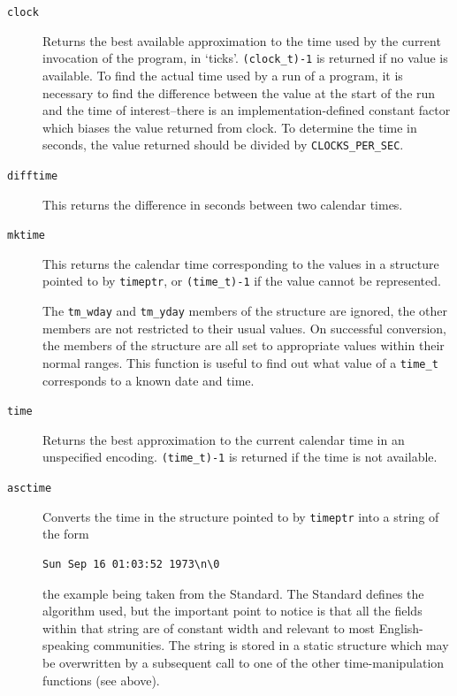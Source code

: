   \begin{description}
   \item[\texttt{clock}] Returns the best available approximation to the time used by  the
    current  invocation  of the program, in `ticks'.
    \texttt{(clock\_t)-1} is returned if no  value  is  available.   To find
    the  actual  time used by a run of a program, it is necessary to find the
    difference between the value at the start  of  the run and the time of
    interest--there is an implementation-defined constant factor which
    biases  the value  returned  from  clock.   To  determine the time in
    seconds,  the  value  returned  should  be   divided   by
    \texttt{CLOCKS\_PER\_SEC}.

   \item[\texttt{difftime}] This  returns  the  difference  in  seconds  between  two calendar
    times.

   \item[\texttt{mktime}] 
    This returns  the  calendar  time  corresponding  to  the values   in
     a  structure  pointed  to  by  \texttt{timeptr},  or
     \texttt{(time\_t)-1} if the value cannot be represented.


    The \texttt{tm\_wday} and \texttt{tm\_yday}  members  of  the
     structure  are ignored,  the  other  members are not restricted to their
     usual values.  On successful conversion, the  members  of the  structure
     are  all set to appropriate values within their normal ranges.  This
     function is useful to find out what  value  of  a \texttt{time\_t}
     corresponds to a known date and time.

   

   \item[\texttt{time}] Returns the best approximation to  the  current  calendar time  in an
    unspecified encoding.  \texttt{(time\_t)-1} is returned if the time is
    not available.

   \item[\texttt{asctime}] 
    Converts the time in the structure pointed to by  \texttt{timeptr}
     into a string of the form


    \begin{Verbatim}
Sun Sep 16 01:03:52 1973\n\0
\end{Verbatim}

    the example being taken from the Standard.  The  Standard defines  the
     algorithm  used, but the important point to notice is that all the fields
     within that string  are  of constant  width  and  relevant  to  most
     English-speaking communities.  The string is stored in a static  structure
     which  may  be overwritten by a subsequent call to one of the other
     time-manipulation functions (see above).


\end{description}
